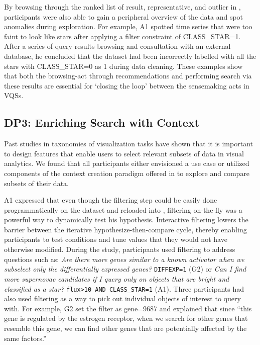 \par By browsing through the ranked list of result, representative, and outlier in \zv, participants were also able to gain a peripheral overview of the data and spot anomalies during exploration. For example, A1 spotted time series that were too faint to look like stars after applying a filter constraint of CLASS\_STAR=1. After a series of query results browsing and consultation with an external database, he concluded that the dataset had been incorrectly labelled with all the stars with CLASS\_STAR=0 as 1 during data cleaning. These examples show that both the browsing-act through recommendations and performing search via these results are essential for `closing the loop' between the sensemaking acts in VQSs.
\subsection{DP3: Enriching Search with Context}
\par Past studies in taxonomies of visualization tasks have shown that it is important to design features that enable users to select relevant subsets of data in visual analytics\cite{Amar2005,Heer2012}. %
We found that all participants either envisioned a use case or utilized components of the context creation paradigm offered in \zv to explore and compare subsets of their data.
\par A1 expressed that even though the filtering step could be easily done programmatically on the dataset and reloaded into \zv, filtering on-the-fly was a powerful way to dynamically test his hypothesis. Interactive filtering lowers the barrier between the iterative hypothesize-then-compare cycle, thereby enabling participants to test conditions and tune values that they would not have otherwise modified.
During the study, participants used filtering to address questions such as: \textit{Are there more genes similar to a known activator when we subselect only the differentially expressed genes?} \texttt{DIFFEXP=1} (G2) or \textit{Can I find more supernovae candidates if I query only on objects that are bright and classified as a star?} \texttt{flux\textgreater10 AND CLASS\_STAR=1} (A1). Three participants had also used filtering as a way to pick out individual objects of interest to query with. For example, G2 set the filter as gene=9687 and explained that since ``this gene is regulated by the estrogen receptor, when we search for other genes that resemble this gene, we can find other genes that are potentially affected by the same factors.''
